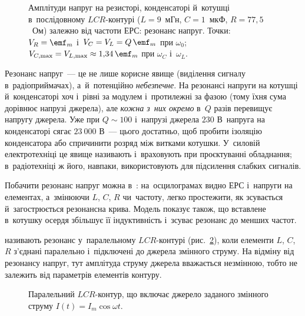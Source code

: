 \begin{figure}[h!]
	\centering
	\caption{Амплітуди напруг на резисторі, конденсаторі й~котушці в~послідовному $LCR$-контурі ($L = 9$~мГн, $C = 1$~мкФ, $R = 77{,}5$~Ом) залежно від частоти ЕРС: резонанс напруг. Точки: $V_R = \emf_m$ і~$V_C = V_L = Q\,\emf_m$ при $\omega_0$; $V_{C,\max} = V_{L,\max} \approx 1{,}34\,\emf_m$ при $\omega_C$ і~$\omega_L$.}
	\label{tikz:voltage_resonance}
\end{figure}

\begin{Attention}
	Резонанс напруг~--- це не лише корисне явище (виділення сигналу в~радіоприймачах), а~й~потенційно \emph{небезпечне}. На резонансі напруги на котушці й~конденсаторі хоч і~рівні за модулем і~протилежні за фазою (тому їхня сума дорівнює напрузі джерела), але \emph{кожна з~них окремо} в~$Q$ разів перевищує напругу джерела. Уже при $Q \sim 100$ і~напрузі джерела $230$ В~напруга на конденсаторі сягає $23\ 000$ В~--- цього достатньо, щоб пробити ізоляцію конденсатора або спричинити розряд між витками котушки. У~силовій електротехніці це явище називають  і~враховують при проєктуванні обладнання; в~радіотехніці ж його, навпаки, використовують для підсилення слабких сигналів.
\end{Attention}


\begin{Simulation}
Побачити резонанс напруг можна в~: на~осцилограмах видно ЕРС і~напруги на елементах, а~змінюючи $L$, $C$, $R$ чи~частоту, легко простежити, як зсувається й~загострюється резонансна крива. Модель показує також, що вставлене в~котушку осердя збільшує її індуктивність і~зсуває резонанс до менших частот.
\end{Simulation}

 називають резонанс у~паралельному $LCR$-контурі (рис.~\ref{tikz:parallel_circuit}), коли елементи $L$, $C$, $R$ з'єднані паралельно і~підключені до джерела змінного струму. На відміну від резонансу напруг, тут амплітуда струму джерела вважається незмінною, тобто не залежить від параметрів елементів контуру.

\begin{figure}
	\centering
	\caption{Паралельний $LCR$-контур, що включає джерело заданого змінного струму $I(t) = I_m \cos\omega t$.}
	\label{tikz:parallel_circuit}
\end{figure}

